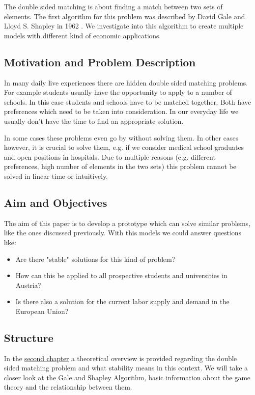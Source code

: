 \label{introduction}
The double sided matching is about finding a match between two sets of elements.
The first algorithm for this problem was described by David Gale and Lloyd S. Shapley in 1962 \cite{gale62a}. 
We investigate into this algorithm to create multiple models with different kind of economic applications.

\subsection{Motivation and Problem Description}
In many daily live experiences there are hidden double sided matching problems. 
For example students usually have the opportunity to apply to a number of schools. 
In this case students and schools have to be matched together. 
Both have preferences which need to be taken into consideration. 
In our everyday life we usually don't have the time to find an appropriate solution. 

In some cases these problems even go by without solving them. 
In other cases however, it is crucial to solve them, e.g. if we consider medical school graduates and open positions in hospitals. 
Due to multiple reasons (e.g. different preferences, high number of elements in the two sets) this problem cannot be solved in linear time or intuitively.

\subsection{Aim and Objectives}
The aim of this paper is to develop a prototype which can solve similar problems, like the ones discussed previously.
With this models we could answer questions like:
\begin{itemize}
	\item Are there "stable" solutions for this kind of problem?
	\item How can this be applied to all prospective students and universities in Austria?
	\item Is there also a solution for the current labor supply and demand in the European Union?
\end{itemize}

\subsection{Structure}
In the \hyperref[theory]{second chapter} a theoretical overview is provided regarding the double sided matching problem and what stability means in this context.
We will take a closer look at the Gale and Shapley Algorithm, basic information about the game theory and the relationship between them.

